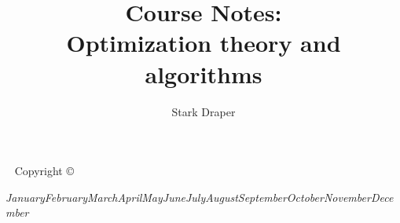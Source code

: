 \documentclass{tufte-book} %
\title{Course Notes: \vspace{1ex} \\ \noindent Optimization theory and algorithms} %
\author[Stark Draper]{Stark Draper} %
\newcommand{\monthyear}{\ifcase\month\or January\or February\or March\or April\or May\or June\or July\or August\or September\or October\or November\or December\fi\space\number\year} %
\newcommand{\openepigraph}[2]{ %
\begin{fullwidth}
\sffamily\large
\begin{doublespace}
\noindent\allcaps{#1}\\ %
\noindent\allcaps{#2} %
\end{doublespace}
\end{fullwidth}
}
\theoremstyle{definition}
\theoremstyle{remark}
\numberwithin{section}{chapter}
\numberwithin{equation}{chapter}
\numberwithin{figure}{chapter}
\begin{document}
\frontmatter





\maketitle %


\newpage
\begin{fullwidth}
~\vfill
\thispagestyle{empty}
\setlength{\parindent}{0pt}
\setlength{\parskip}{\baselineskip}
Copyright \copyright\ \the\year\ \thanklessauthor




\par\textit{\monthyear}
\end{fullwidth}
\end{document}
